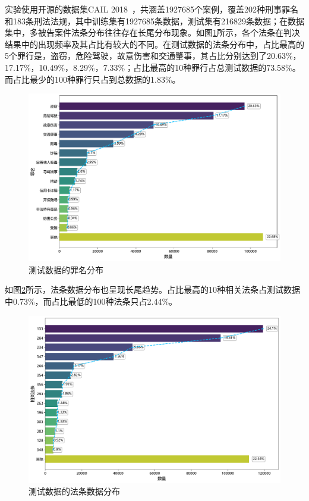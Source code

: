 实验使用开源的数据集CAIL 2018~\cite{xiao2018cail2018largescalelegaldataset}，共涵盖1927685个案例，覆盖202种刑事罪名和183条刑法法规，其中训练集有1927685条数据，测试集有216829条数据；在数据集中，多被告案件法条分布往往存在长尾分布现象。如图\ref{fig:acc_dis}所示，各个法条在判决结果中的出现频率及其占比有较大的不同。在测试数据的法条分布中，占比最高的5个罪行是，盗窃，危险驾驶，故意伤害和交通肇事，其占比分别达到了20.63\%，17.17\%，10.49\%，8.29\%，7.33\%；占比最高的10种罪行占总测试数据的73.58\%。而占比最少的100种罪行只占到总数据的1.83\%。
\begin{figure}[H]
		\centering
		\includegraphics[width=1\linewidth]{fig/accusation_distribution.pdf}
		\caption{测试数据的罪名分布}
		\label{fig:acc_dis}
\end{figure}
如图\ref{fig:art_dis}所示，法条数据分布也呈现长尾趋势。占比最高的10种相关法条占测试数据中0.73\%，而占比最低的100种法条只占2.44\%。
\begin{figure}[H]
    \centering
    \includegraphics[width=1\linewidth]{fig/article_distribution.pdf}
    \caption{测试数据的法条数据分布}
    \label{fig:art_dis}
\end{figure}
